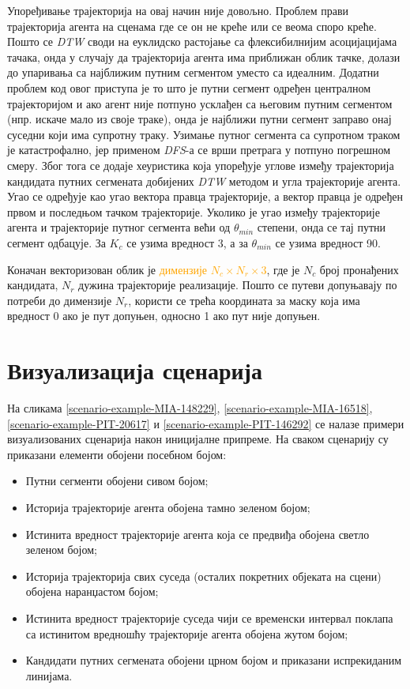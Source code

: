 \documentclass[11pt,oneside]{memoir}
\begin{document}
Упоређивање трајекторија на овај начин није довољно. Проблем прави трајекторија агента на сценама где се он не креће или се веома споро креће. Пошто
се \textit{DTW} своди на еуклидско растојање са флексибилнијим асоцијацијама тачака, 
онда у случају да трајекторија агента има приближан облик тачке, долази до упаривања са најближим путним сегментом уместо са идеалним. Додатни проблем 
код овог приступа је
то што је путни сегмент одређен централном трајекторијом и ако агент није потпуно усклађен са његовим путним сегментом (нпр. искаче мало
из своје траке), онда је 
најближи путни сегмент заправо онај суседни који има супротну траку. Узимање путног сегмента са супротном траком је катастрофално,
јер применом \textit{DFS}-а се врши претрага у потпуно погрешном смеру. Због тога се додаје хеуристика која упоређује углове између
трајекторија кандидата путних сегмената добијених \textit{DTW} методом и угла трајекторије агента. Угао се одређује као угао вектора правца
трајекторије, а вектор правца је одређен првом и последњом тачком трајекторије. Уколико је угао између трајекторије агента и 
трајекторије путног сегмента већи од $\theta_{min}$ степени, онда се тај путни сегмент одбацује. За $K_c$ се узима вредност 3, а
за $\theta_{min}$ се узима вредност 90.

Коначан векторизован облик је \textcolor{orange}{димензије $N_c\times N_r\times 3$}, где је $N_c$ број пронађених кандидата,
$N_r$ дужина трајекторије реализације. Пошто се путеви допуњавају по потреби до димензије $N_r$, користи се трећа координата
за маску која има вредност 0 ако је пут допуњен, односно 1 ако пут није допуњен. 

\section{Визуализација сценарија}

На сликама \ref{scenario-example-MIA-148229}, \ref{scenario-example-MIA-16518}, \ref{scenario-example-PIT-20617} и \ref{scenario-example-PIT-146292} 
се налазе примери визуализованих сценарија након иницијалне припреме. На сваком сценарију су приказани елементи обојени посебном бојом:
\begin{itemize}
  \item Путни сегменти обојени сивом бојом;
  \item Историја трајекторије агента обојена тамно зеленом бојом;
  \item Истинита вредност трајекторије агента која се предвиђа обојена светло зеленом бојом;
  \item Историја трајекторија свих суседа (осталих покретних објеката на сцени) обојена наранџастом бојом;
  \item Истинита вредност трајекторије суседа чији се временски интервал поклапа са истинитом вредношћу трајекторије агента обојена жутом бојом;
  \item Кандидати путних сегмената обојени црном бојом и приказани испрекиданим линијама.
\end{itemize}
\end{document}
